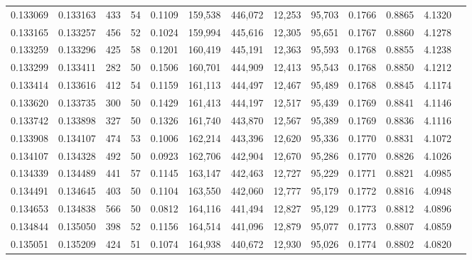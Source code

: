 \begin{tabular}{rrrrrrrrrrrrr}
0.133069 & 0.133163 &   433 &  54 &                                     0.1109 & 159,538 & 446,072 &  12,253 &  95,703 & 0.1766 & 0.8865 & 4.1320 \\
0.133165 & 0.133257 &   456 &  52 &                                     0.1024 & 159,994 & 445,616 &  12,305 &  95,651 & 0.1767 & 0.8860 & 4.1278 \\
0.133259 & 0.133296 &   425 &  58 &                                     0.1201 & 160,419 & 445,191 &  12,363 &  95,593 & 0.1768 & 0.8855 & 4.1238 \\
0.133299 & 0.133411 &   282 &  50 &                                     0.1506 & 160,701 & 444,909 &  12,413 &  95,543 & 0.1768 & 0.8850 & 4.1212 \\
0.133414 & 0.133616 &   412 &  54 &                                     0.1159 & 161,113 & 444,497 &  12,467 &  95,489 & 0.1768 & 0.8845 & 4.1174 \\
0.133620 & 0.133735 &   300 &  50 &                                     0.1429 & 161,413 & 444,197 &  12,517 &  95,439 & 0.1769 & 0.8841 & 4.1146 \\
0.133742 & 0.133898 &   327 &  50 &                                     0.1326 & 161,740 & 443,870 &  12,567 &  95,389 & 0.1769 & 0.8836 & 4.1116 \\
0.133908 & 0.134107 &   474 &  53 &                                     0.1006 & 162,214 & 443,396 &  12,620 &  95,336 & 0.1770 & 0.8831 & 4.1072 \\
0.134107 & 0.134328 &   492 &  50 &                                     0.0923 & 162,706 & 442,904 &  12,670 &  95,286 & 0.1770 & 0.8826 & 4.1026 \\
0.134339 & 0.134489 &   441 &  57 &                                     0.1145 & 163,147 & 442,463 &  12,727 &  95,229 & 0.1771 & 0.8821 & 4.0985 \\
0.134491 & 0.134645 &   403 &  50 &                                     0.1104 & 163,550 & 442,060 &  12,777 &  95,179 & 0.1772 & 0.8816 & 4.0948 \\
0.134653 & 0.134838 &   566 &  50 &                                     0.0812 & 164,116 & 441,494 &  12,827 &  95,129 & 0.1773 & 0.8812 & 4.0896 \\
0.134844 & 0.135050 &   398 &  52 &                                     0.1156 & 164,514 & 441,096 &  12,879 &  95,077 & 0.1773 & 0.8807 & 4.0859 \\
0.135051 & 0.135209 &   424 &  51 &                                     0.1074 & 164,938 & 440,672 &  12,930 &  95,026 & 0.1774 & 0.8802 & 4.0820 \\

\end{tabular}
